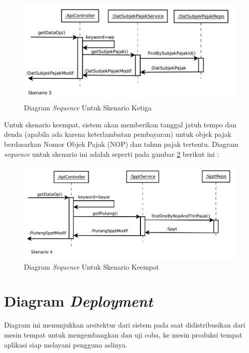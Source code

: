 \begin{figure}[H]
	\centering
	\includegraphics[width=1\textwidth]{./resources/uml/seq-dia-3}
	\caption{Diagram \textit{Sequence} Untuk Skenario Ketiga}
	\label{fig:seq-dia-be-3}
\end{figure}

Untuk skenario keempat, sistem akan memberikan tanggal jatuh tempo dan denda (apabila ada karena keterlambatan pembayaran) untuk objek pajak berdasarkan Nomor Objek Pajak (NOP) dan tahun pajak tertentu. Diagram \textit{sequence} untuk skenario ini adalah seperti pada gambar \ref{fig:seq-dia-be-4} berikut ini :

\begin{figure}[H]	
	\centering
	\includegraphics[width=1\textwidth]{./resources/uml/seq-dia-4}
	\caption{Diagram \textit{Sequence} Untuk Skenario Keempat}
	\label{fig:seq-dia-be-4}
\end{figure}

\section{Diagram \textit{Deployment}}

Diagram ini menunjukkan arsitektur dari sistem pada saat didistribusikan dari mesin tempat untuk mengembangkan dan uji coba, ke mesin produksi tempat aplikasi siap melayani pengguna aslinya.

